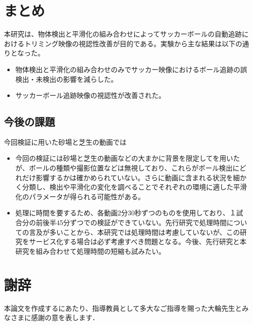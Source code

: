 \documentclass[11pt,a4j]{jreport}
\begin{document}
\chapter{まとめ}

本研究は、物体検出と平滑化の組み合わせによってサッカーボールの自動追跡におけるトリミング映像の視認性改善が目的である。実験から主な結果は以下の通りとなった。

\begin{itemize}
    \item 物体検出と平滑化の組み合わせのみでサッカー映像におけるボール追跡の誤検出・未検出の影響を減らした。
    \item サッカーボール追跡映像の視認性が改善された。
\end{itemize}

\section{今後の課題}

今回検証に用いた砂場と芝生の動画では

\begin{itemize}
    \item 今回の検証には砂場と芝生の動画などの大まかに背景を限定してを用いたが、ボールの種類や撮影位置などは無視しており、これらがボール検出にどれだけ影響するかは確かめられていない。さらに動画に含まれる状況を細かく分類し、検出や平滑化の変化を調べることでそれぞれの環境に適した平滑化のパラメータが得られる可能性がある。
    \item 処理に時間を要するため、各動画2分30秒ずつのものを使用しており、１試合分の前後半45分ずつでの検証ができていない。先行研究で処理時間についての言及が多いことから、本研究では処理時間は考慮していないが、この研究をサービス化する場合は必ず考慮すべき問題となる。今後、先行研究と本研究を組み合わせて処理時間の短縮も試みたい。
\end{itemize}

\chapter*{謝辞} %
本論文を作成するにあたり、指導教員として多大なご指導を賜った大輪先生とみなさまに感謝の意を表します．

\end{document}
